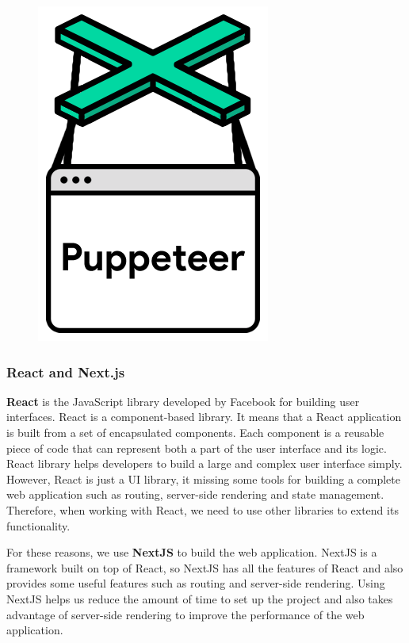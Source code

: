 \begin{figure}[ht]
    \centering 
    \includegraphics[height=0.2\textheight]{../Images/8.Technology_Stack/puppeteer.png}
\end{figure}

\subsubsection{React and Next.js}
\textbf{React} is the JavaScript library developed by Facebook for building user interfaces. React is a component-based library. It means that a React application is built from a set of encapsulated components. Each component is a reusable piece of code that can represent both a part of the user interface and its logic. React library helps developers to build a large and complex user interface simply. However, React is just a UI library, it missing some tools for building a complete web application such as routing, server-side rendering and state management. Therefore, when working with React, we need to use other libraries to extend its functionality. 

For these reasons, we use \textbf{NextJS} to build the web application. NextJS is a framework built on top of React, so NextJS has all the features of React and also provides some useful features such as routing and server-side rendering. Using NextJS helps us reduce the amount of time to set up the project and also takes advantage of server-side rendering to improve the performance of the web application.

